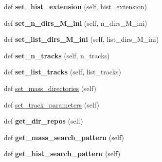 \begin{DoxyCompactItemize}
def {\bfseries set\+\_\+hist\+\_\+extension} (self, hist\+\_\+extension)
\item 
\mbox{\label{classasamba_1_1var__def_1_1tracks_aaa05dae334bf401bb6a5a68c3bdd44aa}} 
def {\bfseries set\+\_\+n\+\_\+dirs\+\_\+\+M\+\_\+ini} (self, n\+\_\+dirs\+\_\+\+M\+\_\+ini)
\item 
\mbox{\label{classasamba_1_1var__def_1_1tracks_ab4111e6b26edf9e76ceb96bec4763064}} 
def {\bfseries set\+\_\+list\+\_\+dirs\+\_\+\+M\+\_\+ini} (self, list\+\_\+dirs\+\_\+\+M\+\_\+ini)
\item 
\mbox{\label{classasamba_1_1var__def_1_1tracks_a148ce756693d708911775b3c2820c1f0}} 
def {\bfseries set\+\_\+n\+\_\+tracks} (self, n\+\_\+tracks)
\item 
\mbox{\label{classasamba_1_1var__def_1_1tracks_ad8905211d69ef4b3199cedc83bc94803}} 
def {\bfseries set\+\_\+list\+\_\+tracks} (self, list\+\_\+tracks)
\item 
def \hyperlink{classasamba_1_1var__def_1_1tracks_abd062bf94f2cd69eab54d2a081bebad1}{set\+\_\+mass\+\_\+directories} (self)
\item 
def \hyperlink{classasamba_1_1var__def_1_1tracks_a743c0e7e4af42a5c67f8a4be54a7d3c6}{set\+\_\+track\+\_\+parameters} (self)
\item 
\mbox{\label{classasamba_1_1var__def_1_1tracks_a8a24194336cd06e10cd0e4431cff963f}} 
def {\bfseries get\+\_\+dir\+\_\+repos} (self)
\item 
\mbox{\label{classasamba_1_1var__def_1_1tracks_ae2293a407b4f731e3f76de188de57ec5}} 
def {\bfseries get\+\_\+mass\+\_\+search\+\_\+pattern} (self)
\item 
\mbox{\label{classasamba_1_1var__def_1_1tracks_aeb2f2c3e19db68028deb8bcd65eee114}} 
def {\bfseries get\+\_\+hist\+\_\+search\+\_\+pattern} (self)
\item 
\mbox{\label{classasamba_1_1var__def_1_1tracks_aac18c3f27f1fe9d5fc9005461f57d000}} 

\end{DoxyCompactItemize}
